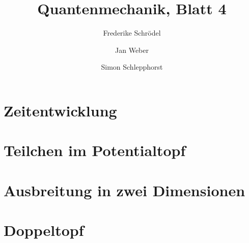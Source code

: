 \documentclass[11pt, ngerman, fleqn, DIV=15, headinclude]{scrartcl}
\title{Quantenmechanik, Blatt 4}
\author{
    Frederike Schrödel \and Jan Weber \and Simon Schlepphorst
}
\begin{document}
\maketitle

\section{Zeitentwicklung}

\section{Teilchen im Potentialtopf}

\section{Ausbreitung in zwei Dimensionen}

\section{Doppeltopf}
\end{document}
